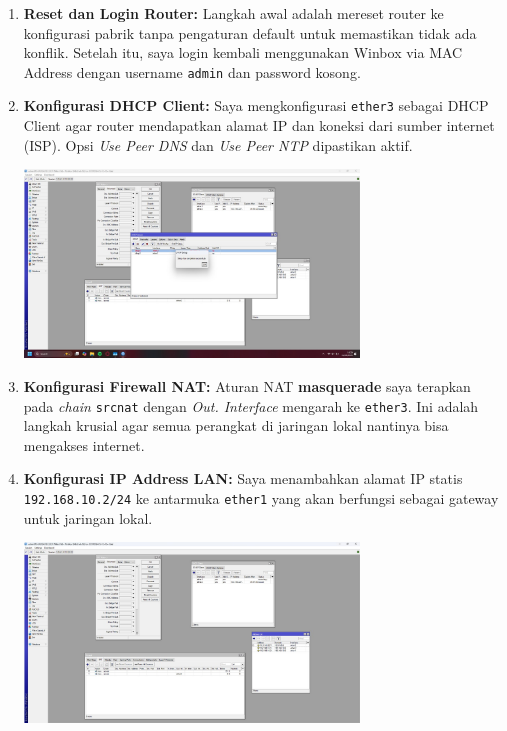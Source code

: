 \begin{enumerate}
    \item \textbf{Reset dan Login Router:} Langkah awal adalah mereset router ke konfigurasi pabrik tanpa pengaturan default untuk memastikan tidak ada konflik. Setelah itu, saya login kembali menggunakan Winbox via MAC Address dengan username \texttt{admin} dan password kosong.
    
    \item \textbf{Konfigurasi DHCP Client:} Saya mengkonfigurasi \texttt{ether3} sebagai DHCP Client agar router mendapatkan alamat IP dan koneksi dari sumber internet (ISP). Opsi \textit{Use Peer DNS} dan \textit{Use Peer NTP} dipastikan aktif.
    \begin{center}
        \includegraphics[width=0.7\textwidth]{img5/DHCPClient.jpeg} 
    \end{center}
    
    \item \textbf{Konfigurasi Firewall NAT:} Aturan NAT \textbf{masquerade} saya terapkan pada \textit{chain} \texttt{srcnat} dengan \textit{Out. Interface} mengarah ke \texttt{ether3}. Ini adalah langkah krusial agar semua perangkat di jaringan lokal nantinya bisa mengakses internet.
    
    \item \textbf{Konfigurasi IP Address LAN:} Saya menambahkan alamat IP statis \texttt{192.168.10.2/24} ke antarmuka \texttt{ether1} yang akan berfungsi sebagai gateway untuk jaringan lokal.
    \begin{center}
        \includegraphics[width=0.7\textwidth]{img5/LANIP.jpeg} 
    \end{center}
    

\end{enumerate}
